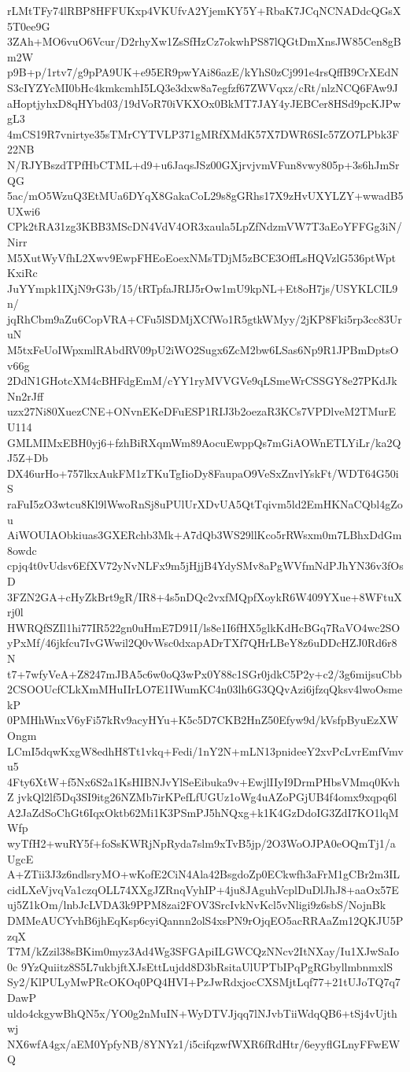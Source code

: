 rLMtTFy74lRBP8HFFUKxp4VKUfvA2YjemKY5Y+RbaK7JCqNCNADdcQGsX5T0ee9G
3ZAh+MO6vuO6Vcur/D2rhyXw1ZsSfHzCz7okwhPS87lQGtDmXnsJW85Cen8gBm2W
p9B+p/1rtv7/g9pPA9UK+e95ER9pwYAi86azE/kYhS0zCj991e4rsQffB9CrXEdN
S3cIYZYcMI0bHc4kmkcmhI5LQ3e3dxw8a7egfzf67ZWVqxz/cRt/nlzNCQ6FAw9J
aHoptjyhxD8qHYbd03/19dVoR70iVKXOx0BkMT7JAY4yJEBCer8HSd9pcKJPwgL3
4mCS19R7vnirtye35sTMrCYTVLP371gMRfXMdK57X7DWR6SIc57ZO7LPbk3F22NB
N/RJYBszdTPfHbCTML+d9+u6JaqsJSz00GXjrvjvmVFun8vwy805p+3s6hJmSrQG
5ac/mO5WzuQ3EtMUa6DYqX8GakaCoL29s8gGRhs17X9zHvUXYLZY+wwadB5UXwi6
CPk2tRA31zg3KBB3MScDN4VdV4OR3xaula5LpZfNdzmVW7T3aEoYFFGg3iN/Nirr
M5XutWyVfhL2Xwv9EwpFHEoEoexNMsTDjM5zBCE3OffLsHQVzlG536ptWptKxiRc
JuYYmpk1IXjN9rG3b/15/tRTpfaJRIJ5rOw1mU9kpNL+Et8oH7js/USYKLCIL9n/
jqRhCbm9aZu6CopVRA+CFu5lSDMjXCfWo1R5gtkWMyy/2jKP8Fki5rp3cc83UruN
M5txFeUoIWpxmlRAbdRV09pU2iWO2Sugx6ZcM2bw6LSas6Np9R1JPBmDptsOv66g
2DdN1GHotcXM4cBHFdgEmM/cYY1ryMVVGVe9qLSmeWrCSSGY8e27PKdJkNn2rJff
uzx27Ni80XuezCNE+ONvnEKeDFuESP1RIJ3b2oezaR3KCs7VPDlveM2TMurEU114
GMLMIMxEBH0yj6+fzhBiRXqmWm89AocuEwppQs7mGiAOWnETLYiLr/ka2QJ5Z+Db
DX46urHo+757lkxAukFM1zTKuTgIioDy8FaupaO9VeSxZnvlYskFt/WDT64G50iS
raFuI5zO3wtcu8Kl9lWwoRnSj8uPUlUrXDvUA5QtTqivm5ld2EmHKNaCQbl4gZou
AiWOUIAObkiuas3GXERchb3Mk+A7dQb3WS29llKco5rRWsxm0m7LBhxDdGm8owdc
cpjq4t0vUdsv6EfXV72yNvNLFx9m5jHjjB4YdySMv8aPgWVfmNdPJhYN36v3fOsD
3FZN2GA+cHyZkBrt9gR/IR8+4s5nDQc2vxfMQpfXoykR6W409YXue+8WFtuXrj0l
HWRQfSZIl1hi77IR522gn0uHmE7D91I/ls8e1I6fHX5glkKdHcBGq7RaVO4wc2SO
yPxMf/46jkfcu7IvGWwil2Q0vWsc0dxapADrTXf7QHrLBeY8z6uDDcHZJ0Rd6r8N
t7+7wfyVeA+Z8247mJBA5c6w0oQ3wPx0Y88c1SGr0jdkC5P2y+c2/3g6mijsuCbb
2CSOOUcfCLkXmMHuIIrLO7E1IWumKC4n03lh6G3QQvAzi6jfzqQksv4lwoOsmekP
0PMHhWnxV6yFi57kRv9acyHYu+K5c5D7CKB2HnZ50Efyw9d/kVsfpByuEzXWOngm
LCmI5dqwKxgW8edhH8Tt1vkq+Fedi/1nY2N+mLN13pnideeY2xvPcLvrEmfVmvu5
4Fty6XtW+f5Nx6S2a1KsHIBNJvYlSeEibuka9v+EwjlIIyI9DrmPHbsVMmq0KvhZ
jvkQl2lf5Dq3SI9itg26NZMb7irKPefLfUGUz1oWg4uAZoPGjUB4f4omx9xqpq6l
A2JaZdSoChGt6IqxOktb62Mi1K3PSmPJ5hNQxg+k1K4GzDdoIG3ZdI7KO1lqMWfp
wyTfH2+wuRY5f+foSsKWRjNpRyda7slm9xTvB5jp/2O3WoOJPA0eOQmTj1/aUgcE
A+ZTii3J3z6ndlsryMO+wKofE2CiN4Ala42BsgdoZp0ECkwfh3aFrM1gCBr2m3IL
cidLXeVjvqVa1czqOLL74XXgJZRnqVyhIP+4ju8JAguhVcplDuDlJhJ8+aaOx57E
uj5Z1kOm/lnbJcLVDA3k9PPM8zai2FOV3SrcIvkNvKcl5vNligi9z6sbS/NojnBk
DMMeAUCYvhB6jhEqKsp6cyiQannn2olS4xsPN9rOjqEO5acRRAaZm12QKJU5PzqX
T7M/kZzil38sBKim0myz3Ad4Wg3SFGApiILGWCQzNNcv2ItNXay/Iu1XJwSaIo0c
9YzQuiitz8S5L7ukbjftXJsEttLujdd8D3bRsitaUlUPTbIPqPgRGbyllmbnmxlS
Sy2/KlPULyMwPRcOKOq0PQ4HVI+PzJwRdxjocCXSMjtLqf77+21tUJoTQ7q7DawP
uldo4ckgywBhQN5x/YO0g2nMuIN+WyDTVJjqq7lNJvbTiiWdqQB6+tSj4vUjthwj
NX6wfA4gx/aEM0YpfyNB/8YNYz1/i5cifqzwfWXR6fRdHtr/6eyyflGLnyFFwEWQ
